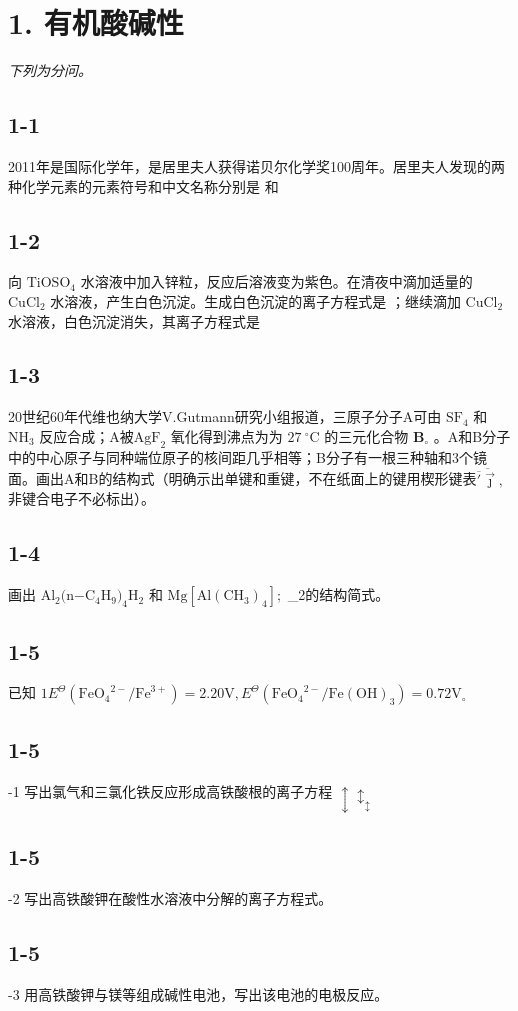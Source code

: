 \section*{1. 有机酸碱性}
\textit{下列为分问。}

\subsection*{1-1}
2011年是国际化学年，是居⾥夫⼈获得诺⻉尔化学奖100周年。居⾥夫⼈发现的两种化学元素的元素符号和中⽂名称分别是 和

\subsection*{1-2}
向 $\mathrm { T i O S O _ { 4 } }$ ⽔溶液中加⼊锌粒，反应后溶液变为紫⾊。在清夜中滴加适量的 $\mathrm { C u C l _ { 2 } }$ ⽔溶液，产⽣⽩⾊沉淀。⽣成⽩⾊沉淀的离⼦⽅程式是 ；继续滴加 $\mathrm { C u C l _ { 2 } }$ ⽔溶液，⽩⾊沉淀消失，其离⼦⽅程式是

\subsection*{1-3}
20世纪60年代维也纳⼤学V.Gutmann研究⼩组报道，三原⼦分⼦A可由 $\mathrm { S F _ { 4 } }$ 和 $\mathrm { N H _ { 3 } }$ 反应合成；A被$\mathrm { A g F } _ { 2 }$ 氧化得到沸点为为 $2 7 ~ ^ { \circ } \mathrm { C }$ 的三元化合物 $\mathbf { B } _ { \circ }$ 。A和B分⼦中的中⼼原⼦与同种端位原⼦的核间距⼏乎相等；B分⼦有⼀根三种轴和3个镜⾯。画出A和B的结构式（明确⽰出单键和重键，不在纸⾯上的键⽤楔形键表${ \overline { { \overline { { \prime } } } \vec { \jmath } } } ,$ ⾮键合电⼦不必标出）。

\subsection*{1-4}
画出 $\mathrm { A l _ { 2 } ( n \mathrm { - C _ { 4 } H _ { 9 } ) _ { 4 } H _ { 2 } } }$ 和 $\mathrm { M g [ A l ( C H _ { 3 } ) _ { 4 } ] } ;$ _{2}的结构简式。

\subsection*{1-5}
已知 $1 E ^ { \Theta } ( \mathrm { F e O _ { 4 } } ^ { 2 - } / \mathrm { F e } ^ { 3 + } ) = 2 . 2 0 \mathrm { V } , E ^ { \Theta } ( \mathrm { F e O _ { 4 } } ^ { 2 - } / \mathrm { F e } ( \mathrm { O H } ) _ { 3 } ) = 0 . 7 2 \mathrm { V } _ { \circ }$

\subsection*{1-5}
-1 写出氯⽓和三氯化铁反应形成⾼铁酸根的离⼦⽅程 $\updownarrow \updownarrow _ { \updownarrow }$

\subsection*{1-5}
-2 写出⾼铁酸钾在酸性⽔溶液中分解的离⼦⽅程式。

\subsection*{1-5}
-3 ⽤⾼铁酸钾与镁等组成碱性电池，写出该电池的电极反应。
